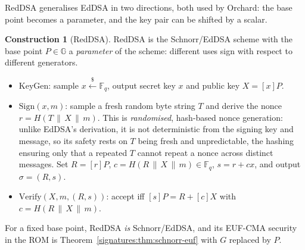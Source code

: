 \documentclass[11pt,a4paper]{article}
\theoremstyle{definition}
\newtheorem{construction}[theorem]{Construction}
\theoremstyle{remark}
\newcommand{\G}{\ensuremath{\mathbb{G}}}
\newcommand{\Fq}{\ensuremath{\mathbb{F}_{q}}}
\begin{document}
RedDSA generalises EdDSA in two directions, both used by Orchard: the
base point becomes a parameter, and the key pair can be shifted by a
scalar.

\begin{construction}[RedDSA]\label{signatures:con:reddsa}
RedDSA is the Schnorr/EdDSA scheme with the base point
\(P \in \G\) a \emph{parameter} of the scheme: different uses sign
with respect to different generators.
\begin{itemize}
\item \(\mathrm{KeyGen}\): sample \(x \xleftarrow{\$} \Fq\), output
  secret key \(x\) and public key \(X = [x]P\).
\item \(\mathrm{Sign}(x, m)\): sample a fresh random byte string
  \(T\) and derive the nonce \(r = H(T \,\|\, X \,\|\, m)\). This
  is \emph{randomised}, hash-based nonce generation: unlike EdDSA's
  derivation, it is not deterministic from the signing key and
  message, so its safety rests on \(T\) being fresh and
  unpredictable, the hashing ensuring only that a repeated \(T\)
  cannot repeat a nonce across distinct messages. Set
  \(R = [r]P\), \(c = H(R \,\|\, X \,\|\, m) \in \Fq\),
  \(s = r + cx\), and output \(\sigma = (R, s)\).
\item \(\mathrm{Verify}(X, m, (R, s))\): accept iff
  \([s]P = R + [c]X\) with \(c = H(R \,\|\, X \,\|\, m)\).
\end{itemize}
For a fixed base point, RedDSA \emph{is} Schnorr/EdDSA, and its
EUF-CMA security in the ROM is
Theorem~\ref{signatures:thm:schnorr-euf} with \(G\) replaced by
\(P\).
\end{construction}
\end{document}
